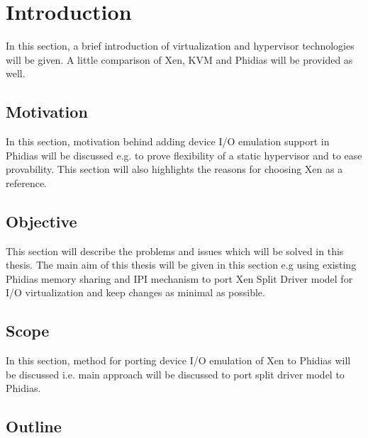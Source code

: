 \chapter{Introduction\label{cha:chapter1}}

In this section, a brief introduction of virtualization and hypervisor technologies will be given. A little comparison of Xen, KVM and Phidias will be provided as well.

\section{Motivation\label{sec:moti}}

In this section, motivation behind adding device I/O emulation support in Phidias will be discussed e.g. to prove flexibility of a static hypervisor and to ease provability. This section will also highlights the reasons for choosing Xen as a reference.

\section{Objective\label{sec:objective}}

This section will describe the problems and issues which will be solved in this thesis. The main aim of this thesis will be given in this section e.g using existing Phidias memory sharing and IPI mechanism to port Xen Split Driver model for I/O virtualization and keep changes as minimal as possible.

\section{Scope\label{sec:scope}}

In this section, method for porting device I/O emulation of Xen to Phidias will be discussed i.e. main approach will be discussed to port split driver model to Phidias. 

\section{Outline\label{sec:outline}}

